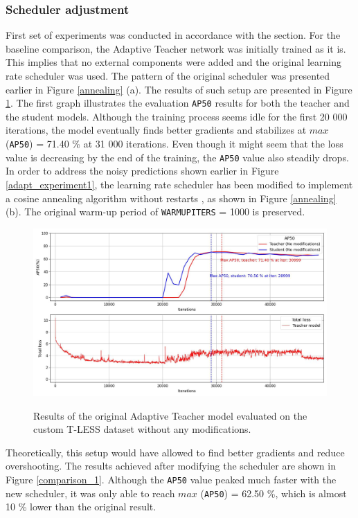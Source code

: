 \subsubsection{Scheduler adjustment}
\label{scheduler_section} 
First set of experiments was conducted in accordance with the  section.  For the baseline comparison, the Adaptive Teacher network was initially trained as it is. This implies that no external components were added and the original learning rate scheduler was used. The pattern of the original scheduler was presented earlier in Figure \ref{annealing} (a). The results of such setup are presented in Figure \ref{original_experiment}. The first graph illustrates the evaluation \texttt{AP50} results for both the teacher and the student models. Although the training process seems idle for the first 20 000 iterations, the model eventually finds better gradients and stabilizes at $max$ (\texttt{AP50}) = 71.40 \% at 31 000 iterations. Even though it might seem that the loss value is decreasing by the end of the training, the \texttt{AP50} value also steadily drops. In order to address the noisy predictions shown earlier in Figure \ref{adapt_experiment1}, the learning rate scheduler has been modified to implement a cosine annealing algorithm without restarts \cite{Loshchilov2016}, as shown in Figure \ref{annealing} (b). The original warm-up period of \texttt{WARMUP\textunderscore ITERS} = 1000 is preserved. 

\begin{figure}[htb]
	\begin{center}
		\includegraphics[width=16cm]{./loss&AP50_original.jpg}
	\end{center}
	\caption{Results of the original Adaptive Teacher model evaluated on the custom T-LESS dataset without any modifications.}
	\begin{center}
		\label{original_experiment}
	\end{center}
\end{figure}
Theoretically, this setup would have allowed to find better gradients and reduce overshooting. The results achieved after modifying the scheduler are shown in Figure \ref{comparison_1}. Although the \texttt{AP50} value peaked much faster with the new scheduler, it was only able to reach $max$ (\texttt{AP50}) = 62.50 \%, which is almost 10 \% lower than the original result.   

